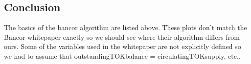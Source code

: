 \documentclass[11pt]{article}
\begin{document}
    \begin{center}
    \end{center}
    { \hspace*{\fill} \\}
    
    \begin{center}
    \end{center}
    { \hspace*{\fill} \\}
    
    \begin{center}
    \end{center}
    { \hspace*{\fill} \\}
    
    \subsection{Conclusion}\label{conclusion}

The basics of the bancor algorithm are listed above. These plots don't
match the Bancor whitepaper exactly so we should see where their
algorithm differs from ours. Some of the variables used in the
whitepaper are not explicitly defined so we had to assume that
outstandingTOKbalance = circulatingTOKsupply, etc..


    
    
    
    
\end{document}
